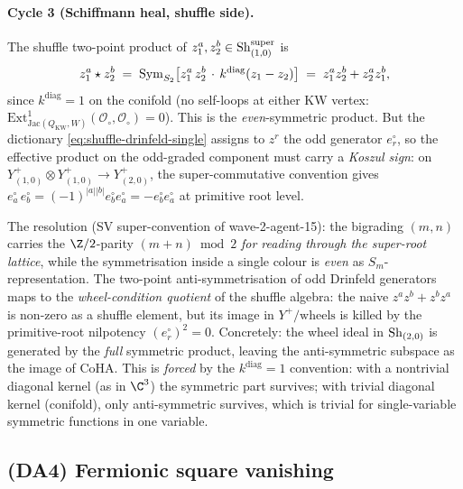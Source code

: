 \paragraph{Cycle 3 (Schiffmann heal, shuffle side).} The shuffle
two-point product of $z_1^a, z_2^b \in \mathrm{Sh}^{\mathrm{super}}_{(1,0)}$
is
\begin{equation}
\label{eq:shuffle-two-point-same-colour}
  z_1^a \star z_2^b
  \;=\;
  \mathrm{Sym}_{S_2}\bigl[z_1^a\, z_2^b\, \cdot\, k^{\mathrm{diag}}(z_1-z_2)\bigr]
  \;=\;
  z_1^a z_2^b + z_2^a z_1^b,
\end{equation}
since $k^{\mathrm{diag}} = 1$ on the conifold (no self-loops at either
KW vertex: $\mathrm{Ext}^1_{\mathrm{Jac}(Q_{\mathrm{KW}},W)}(
\mathcal O_\circ, \mathcal O_\circ) = 0$). This is the
\emph{even}-symmetric product. But the dictionary \eqref{eq:shuffle-drinfeld-single}
assigns to $z^r$ the odd generator $e^\circ_r$, so the effective product
on the odd-graded component must carry a \emph{Koszul sign}:
on $Y^+_{(1,0)} \otimes Y^+_{(1,0)} \to Y^+_{(2,0)}$, the super-commutative
convention gives $e^\circ_a\, e^\circ_b = (-1)^{|a||b|} e^\circ_b e^\circ_a
= -e^\circ_b e^\circ_a$ at primitive root level.

The resolution (SV super-convention of wave-2-agent-15): the bigrading
$(m,n)$ carries the $\Z/2$-parity $(m+n) \bmod 2$ \emph{for reading
through the super-root lattice}, while the symmetrisation inside a
single colour is \emph{even} as $S_m$-representation. The two-point
anti-symmetrisation of odd Drinfeld generators maps to the
\emph{wheel-condition quotient} of the shuffle algebra: the naive
$z^a z^b + z^b z^a$ is non-zero as a shuffle element, but its image
in $Y^+/\text{wheels}$ is killed by the primitive-root nilpotency
$(e^\circ_r)^2 = 0$. Concretely: the wheel ideal in $\mathrm{Sh}_{(2,0)}$ is
generated by the \emph{full} symmetric product, leaving the anti-symmetric
subspace as the image of CoHA. This is \emph{forced} by the
$k^{\mathrm{diag}} = 1$ convention: with a nontrivial diagonal kernel
(as in $\C^3$) the symmetric part survives; with trivial diagonal
kernel (conifold), only anti-symmetric survives, which is trivial
for single-variable symmetric functions in one variable.

\subsection*{(DA4) Fermionic square vanishing}

